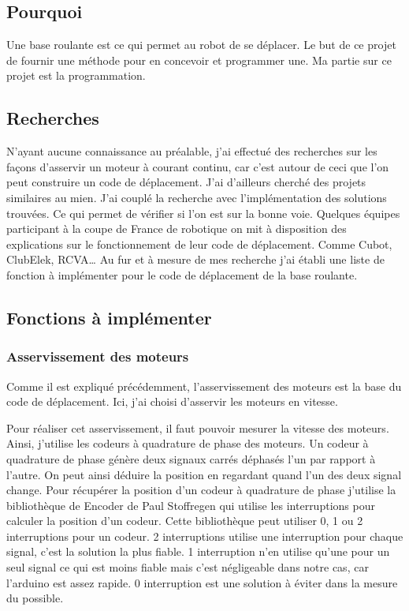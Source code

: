 \documentclass[11pt,a4paper]{report}
\begin{document}
    \subsection{Pourquoi}
      Une base roulante est ce qui permet au robot de se déplacer. Le but de ce projet de fournir une méthode pour en concevoir et programmer une. Ma partie sur ce projet est la programmation.

    \subsection{Recherches}
      N'ayant aucune connaissance au préalable, j'ai effectué des recherches sur les façons d'asservir un moteur à courant continu, car c'est autour de ceci que l'on peut construire un code de déplacement. J'ai d'ailleurs cherché des projets similaires au mien.
      J'ai couplé la recherche avec l'implémentation des solutions trouvées. Ce qui permet de vérifier si l'on est sur la bonne voie.
      Quelques équipes participant à la coupe de France de robotique on mit à disposition des explications sur le fonctionnement de leur code de déplacement. Comme Cubot, ClubElek, RCVA…
      Au fur et à mesure de mes recherche j'ai établi une liste de fonction à implémenter pour le code de déplacement de la base roulante.

    \subsection{Fonctions à implémenter}
      \subsubsection{Asservissement des moteurs}
        Comme il est expliqué précédemment, l'asservissement des moteurs est la base du code de déplacement. Ici, j'ai choisi d'asservir les moteurs en vitesse.

        Pour réaliser cet asservissement, il faut pouvoir mesurer la vitesse des moteurs. Ainsi, j'utilise les codeurs à quadrature de phase des moteurs.
        Un codeur à quadrature de phase génère deux signaux carrés déphasés l'un par rapport à l'autre. On peut ainsi déduire la position en regardant quand l'un des deux signal change.
        Pour récupérer la position d'un codeur à quadrature de phase j'utilise la bibliothèque de Encoder de Paul Stoffregen qui utilise les interruptions pour calculer la position d'un codeur. Cette bibliothèque peut utiliser 0, 1 ou 2 interruptions pour un codeur. 2 interruptions utilise une interruption pour chaque signal, c'est la solution la plus fiable. 1 interruption n'en utilise qu'une pour un seul signal ce qui est moins fiable mais c'est négligeable dans notre cas, car l'arduino est assez rapide. 0 interruption est une solution à éviter dans la mesure du possible.
\end{document}
